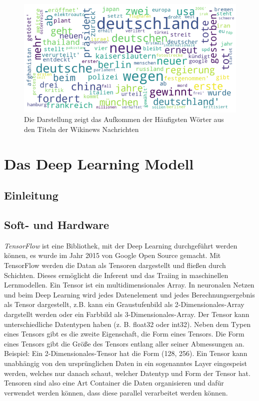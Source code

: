\begin{figure}[H]
    \centering
    \includegraphics[width=12cm]{kapitel5/news.png}
    \caption[Word Cloud Analyse für die Wikinews Schlagzeilen]{Die Darstellung zeigt das Aufkommen der Häufigsten Wörter aus den Titeln der Wikinews Nachrichten}
    \label{Kap5:clwc}
\end{figure}


\section{Das Deep Learning Modell}
\subsection{Einleitung}
\subsection{Soft- und Hardware}
\textit{TensorFlow} ist eine Bibliothek, mit der Deep Learning durchgeführt werden können, es wurde im Jahr 2015 von Google Open Source gemacht. Mit TensorFlow werden die Datan als Tensoren dargestellt und fließen durch Schichten. Dieses ermöglicht die Inferent und das Traiing in maschinellen Lernmodellen. Ein Tensor ist ein multidimensionales Array. In neuronalen Netzen und beim Deep Learning wird jedes Datenelement und jedes Berechnungsergebnis als Tensor dargestellt, z.B. kann ein Graustufenbild als 2-Dimensionales-Array dargstellt werden oder ein Farbbild als 3-Dimensionales-Array. Der Tensor kann unterschiedliche Datentypen haben (z. B. float32 oder int32). Neben dem Typen eines Tensors gibt es die zweite Eigenschaft, die Form eines Tensors. Die Form eines Tensors gibt die Größe des Tensors entlang aller seiner Abmessungen an. Beispiel: Ein 2-Dimensionales-Tensor hat die Form (128, 256). Ein Tensor kann unabhängig von den ursprünglichen Daten in ein sogenanntes Layer eingespeist werden, welches nur danach schaut, welcher Datentyp und Form der Tensor hat. Tensoren sind also eine Art Container die Daten organisieren und dafür verwendet werden können, dass diese parallel verarbeitet werden können.


